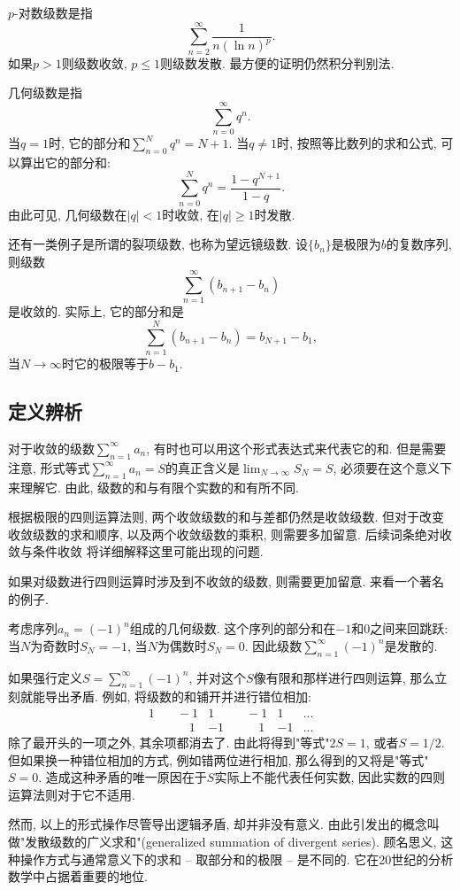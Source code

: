 $p$-对数级数是指
$$
\sum_{n=2}^\infty\frac{1}{n(\ln n)^p}.
$$
如果$p>1$则级数收敛, $p\leq1$则级数发散. 最方便的证明仍然积分判别法.

几何级数是指
$$
\sum_{n=0}^\infty q^n.
$$
当$q=1$时, 它的部分和$\sum_{n=0}^N q^n=N+1$. 当$q\neq1$时, 按照等比数列的求和公式, 可以算出它的部分和:
$$
\sum_{n=0}^N q^n=\frac{1-q^{N+1}}{1-q}.
$$
由此可见, 几何级数在$|q|<1$时收敛, 在$|q|\geq1$时发散.

还有一类例子是所谓的裂项级数, 也称为望远镜级数. 设$\{b_n\}$是极限为$b$的复数序列, 则级数
$$
\sum_{n=1}^\infty(b_{n+1}-b_n)
$$
是收敛的. 实际上, 它的部分和是
$$
\sum_{n=1}^N(b_{n+1}-b_n)=b_{N+1}-b_1,
$$
当$N\to\infty$时它的极限等于$b-b_1$.

\subsection{定义辨析}
对于收敛的级数$\sum_{n=1}^\infty a_n$, 有时也可以用这个形式表达式来代表它的和. 但是需要注意, 形式等式$\sum_{n=1}^\infty a_n=S$的真正含义是$\lim_{N\to\infty}S_N=S$, 必须要在这个意义下来理解它. 由此, 级数的和与有限个实数的和有所不同. 

根据极限的四则运算法则, 两个收敛级数的和与差都仍然是收敛级数. 但对于改变收敛级数的求和顺序, 以及两个收敛级数的乘积, 则需要多加留意. 后续词条绝对收敛与条件收敛 将详细解释这里可能出现的问题.

如果对级数进行四则运算时涉及到不收敛的级数, 则需要更加留意. 来看一个著名的例子.

\begin{example}{}
考虑序列$a_n=(-1)^n$组成的几何级数. 这个序列的部分和在$-1$和$0$之间来回跳跃: 当$N$为奇数时$S_N=-1$, 当$N$为偶数时$S_N=0$. 因此级数$\sum_{n=1}^\infty(-1)^n$是发散的. 

如果强行定义$S=\sum_{n=1}^\infty(-1)^n$, 并对这个$S$像有限和那样进行四则运算, 那么立刻就能导出矛盾. 例如, 将级数的和铺开并进行错位相加:
$$
\begin{aligned}
1 & \quad-1 & 1 & \quad-1 & 1 &...\\
  & \quad\quad1 & -1 & \quad\quad1 & -1 &...
\end{aligned}
$$
除了最开头的一项之外, 其余项都消去了. 由此将得到"等式"$2S=1$, 或者$S=1/2$. 但如果换一种错位相加的方式, 例如错两位进行相加, 那么得到的又将是"等式"$S=0$. 造成这种矛盾的唯一原因在于$S$实际上不能代表任何实数, 因此实数的四则运算法则对于它不适用.

然而, 以上的形式操作尽管导出逻辑矛盾, 却并非没有意义. 由此引发出的概念叫做"发散级数的广义求和"(generalized summation of divergent series). 顾名思义, 这种操作方式与通常意义下的求和 -- 取部分和的极限 -- 是不同的. 它在20世纪的分析数学中占据着重要的地位.
\end{example}